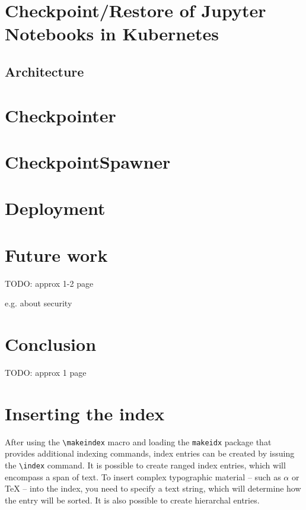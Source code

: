 \documentclass[
  digital,     %
  oneside,     %
  nosansbold,  %
  nocolorbold, %
  lof,         %
  lot,         %
]{fithesis4}
\begin{document}
\chapter{Checkpoint/Restore of Jupyter Notebooks in Kubernetes}

\section{Architecture}

\chapter{Checkpointer}
\label{chap:checkpointer}

\chapter{CheckpointSpawner}
\label{chap:checkpoint_spawner}


\chapter{Deployment}

\chapter{Future work}
TODO: approx 1-2 page

e.g. about security 

\chapter{Conclusion}
TODO: approx 1 page

  \printbibliography[heading=bibintoc] %

\chapter{Inserting the index}
After using the \verb"\makeindex" macro and loading the
\texttt{makeidx} package that provides additional indexing
commands, index entries can be created by issuing the \verb"\index"
command. It is possible to create ranged index
entries, which will encompass a span of text.
To insert complex typographic material -- such as $\alpha$
 or \TeX{}  --
into the index, you need to specify a text string, which will
determine how the entry will be sorted. It is also possible to
create hierarchal entries. 
\end{document}
